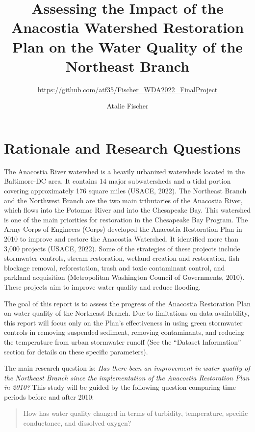 \documentclass[
  12pt,
]{article}
\title{Assessing the Impact of the Anacostia Watershed Restoration Plan
on the Water Quality of the Northeast Branch}
\subtitle{\url{https://github.com/atf35/Fischer_WDA2022_FinalProject}}
\author{Atalie Fischer}
\date{}
\begin{document}
\maketitle

\newpage

\hypertarget{rationale-and-research-questions}{%
\section{Rationale and Research
Questions}\label{rationale-and-research-questions}}

The Anacostia River watershed is a heavily urbanized watersheds located
in the Baltimore-DC area. It contains 14 major subwatersheds and a tidal
portion covering approximately 176 square miles (USACE, 2022). The
Northeast Branch and the Northwest Branch are the two main tributaries
of the Anacostia River, which flows into the Potomac River and into the
Chesapeake Bay. This watershed is one of the main priorities for
restoration in the Chesapeake Bay Program. The Army Corps of Engineers
(Corps) developed the Anacostia Restoration Plan in 2010 to improve and
restore the Anacostia Watershed. It identified more than 3,000 projects
(USACE, 2022). Some of the strategies of these projects include
stormwater controls, stream restoration, wetland creation and
restoration, fish blockage removal, reforestation, trash and toxic
contaminant control, and parkland acquisition (Metropolitan Washington
Council of Governments, 2010). These projects aim to improve water
quality and reduce flooding.

The goal of this report is to assess the progress of the Anacostia
Restoration Plan on water quality of the Northeast Branch. Due to
limitations on data availability, this report will focus only on the
Plan's effectiveness in using green stormwater controls in removing
suspended sediment, removing contaminants, and reducing the temperature
from urban stormwater runoff (See the ``Dataset Information'' section
for details on these specific parameters).

The main research question is: \emph{Has there been an improvement in
water quality of the Northeast Branch since the implementation of the
Anacostia Restoration Plan in 2010?} This study will be guided by the
following question comparing time periods before and after 2010:

\begin{quote}
How has water quality changed in terms of turbidity, temperature,
specific conductance, and dissolved oxygen?
\end{quote}
\end{document}
